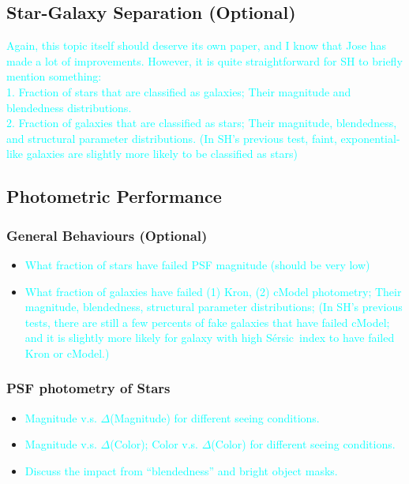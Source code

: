 \documentclass[preprint]{aastex}
\def\ser{{S\'{e}rsic\ }}
\newcommand{\plan}[1]{\textcolor{cyan}{#1}}
\begin{document}
\subsection{Star-Galaxy Separation (Optional)}

    \plan{Again, this topic itself should deserve its own paper, and I know that Jose has 
          made a lot of improvements.  
          However, it is quite straightforward for SH to briefly mention something: \\
              1. Fraction of stars that are classified as galaxies; Their magnitude and 
                 blendedness distributions. \\
              2. Fraction of galaxies that are classified as stars; Their magnitude, 
                 blendedness, and structural parameter distributions. 
                 (In SH's previous test, faint, exponential-like galaxies are slightly 
                 more likely to be classified as stars)}
    
\subsection{Photometric Performance}

\subsubsection{General Behaviours (Optional)}
    
    \begin{itemize}
        \item \plan{What fraction of stars have failed PSF magnitude (should be very low)}
        \item \plan{What fraction of galaxies have failed (1) Kron, (2) cModel photometry;
                    Their magnitude, blendedness, structural parameter distributions; 
                    (In SH's previous tests, there are still a few percents of fake galaxies 
                     that have failed cModel; and it is slightly more likely for galaxy with 
                     high \ser index to have failed Kron or cModel.)}
    \end{itemize} 
    
\subsubsection{PSF photometry of Stars}

    \begin{itemize}
        \item \plan{Magnitude v.s. $\Delta$(Magnitude) for different seeing conditions.}
        \item \plan{Magnitude v.s. $\Delta$(Color); Color v.s. $\Delta$(Color) for 
                    different seeing conditions.}
        \item \plan{Discuss the impact from ``blendedness'' and bright object masks.}
    \end{itemize} 
\end{document}
